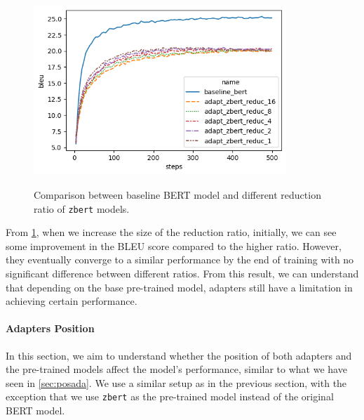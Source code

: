 \begin{figure}[]
    {\includegraphics[width=0.85\textwidth]{img/adapter_zbert_ratio.png}}
    \centering
    \caption{Comparison between baseline BERT model and different reduction ratio of \texttt{zbert} models.}
    \label{img:adapter_zbert_ratio}
\end{figure}

From \cref{img:adapter_zbert_ratio}, when we increase the size of the reduction ratio, initially, we can see some improvement in the BLEU score compared to the higher ratio. However, they eventually converge to a similar performance by the end of training with no significant difference between different ratios. From this result, we can understand that depending on the base pre-trained model, adapters still have a limitation in achieving certain performance.

\paragraph{Adapters Position}
In this section, we aim to understand whether the position of both adapters and the pre-trained models affect the model's performance, similar to what we have seen in \cref{sec:posada}. We use a similar setup as in the previous section, with the exception that we use \texttt{zbert} as the pre-trained model instead of the original BERT model.

